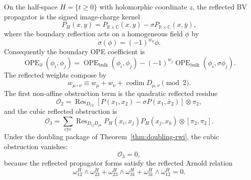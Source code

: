 \begin{theorem}
\ClaimStatusProvedHere
\label{thm:image-charge-reflected-arnold-cancellation}
On the half-space \(H=\{t\ge0\}\) with holomorphic coordinate \(z\), the
reflected BV propagator is the signed image-charge kernel
\begin{equation}
\label{eq:half-space-image-charge-propagator}
P_H(x,y)
=
P_{\mathbb R\times\mathbb C}(x,y)
-
\sigma P_{\mathbb R\times\mathbb C}(x,\bar y),
\end{equation}
where the boundary reflection acts on a homogeneous field \(\phi\) by
\begin{equation}
\label{eq:half-space-reflected-field-weight}
\sigma(\phi)=(-1)^{w_\phi}\phi .
\end{equation}
Consequently the boundary OPE coefficient is
\begin{equation}
\label{eq:half-space-boundary-ope-coefficient}
\operatorname{OPE}_{\partial}(\phi_i,\phi_j)
=
\operatorname{OPE}_{\mathrm{bulk}}(\phi_i,\phi_j)
-
(-1)^{w_j}
\operatorname{OPE}_{\mathrm{bulk}}(\phi_i,\sigma\phi_j).
\end{equation}
The reflected weights compose by
\begin{equation}
\label{eq:half-space-reflected-weight-composition}
w_{\mu\circ\nu}
\equiv
w_\mu+w_\nu+\operatorname{codim}D_{\mu,\nu}
\pmod 2.
\end{equation}
The first non-affine obstruction term is the quadratic reflected residue
\begin{equation}
\label{eq:half-space-quadratic-reflected-obstruction}
\mathcal O_2
=
\operatorname{Res}_{D_{12}}
\left[
P(x_1,x_2)-\sigma P(x_1,\bar x_2)
\right]\otimes\pi_2,
\end{equation}
and the cubic reflected obstruction is
\begin{equation}
\label{eq:half-space-cubic-reflected-obstruction}
\mathcal O_3
=
\sum_{\mathrm{cyc}}
\operatorname{Res}_{D_{ij}D_{jk}}
P_H(x_i,x_j)P_H(x_j,x_k)\otimes[\pi_2,\pi_2].
\end{equation}
Under the doubling package of Theorem~\ref{thm:doubling-rwi}, the cubic
obstruction vanishes:
\begin{equation}
\label{eq:half-space-cubic-obstruction-vanishing}
\mathcal O_3=0,
\end{equation}
because the reflected propagator forms satisfy the reflected Arnold
relation
\begin{equation}
\label{eq:half-space-reflected-arnold-relation}
\omega^H_{12}\wedge\omega^H_{23}
+
\omega^H_{23}\wedge\omega^H_{31}
+
\omega^H_{31}\wedge\omega^H_{12}
=0.
\end{equation}
\end{theorem}

